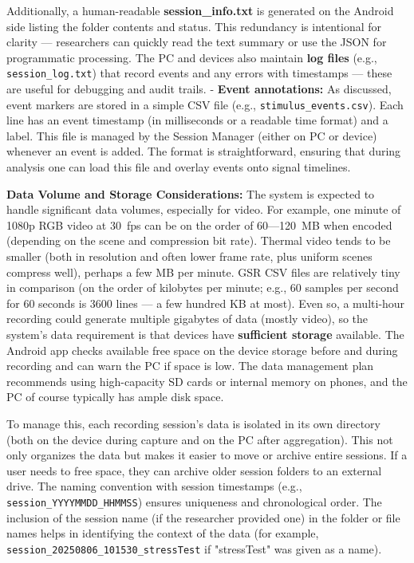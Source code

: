 Additionally, a human-readable \textbf{session_info.txt} is generated on the
Android side listing the folder contents and
status\cite{SessionManagerKt}\cite{Fowles1981}.
This redundancy is intentional for clarity --- researchers can quickly
read the text summary or use the JSON for programmatic processing. The
PC and devices also maintain \textbf{log files} (e.g., \texttt{session_log.txt})
that record events and any errors with timestamps --- these are useful
for debugging and audit trails. - \textbf{Event annotations:} As discussed,
event markers are stored in a simple CSV file (e.g.,
\texttt{stimulus_events.csv}). Each line has an event timestamp (in
milliseconds or a readable time format) and a label. This file is
managed by the Session Manager (either on PC or device) whenever an
event is
added\cite{ContactlessStressThermal2022}.
The format is straightforward, ensuring that during analysis one can
load this file and overlay events onto signal timelines.

\textbf{Data Volume and Storage Considerations:} The system is expected to
handle significant data volumes, especially for video. For example, one
minute of 1080p RGB video at 30 fps can be on the order of 60---120 MB
when encoded (depending on the scene and compression bit rate). Thermal
video tends to be smaller (both in resolution and often lower frame
rate, plus uniform scenes compress well), perhaps a few MB per minute.
GSR CSV files are relatively tiny in comparison (on the order of
kilobytes per minute; e.g., 60 samples per second for 60 seconds is 3600
lines --- a few hundred KB at most). Even so, a multi-hour recording
could generate multiple gigabytes of data (mostly video), so the
system's data requirement is that devices have \textbf{sufficient storage}
available. The Android app checks available free space on the device
storage before and during
recording\cite{SessionManagerKt}
and can warn the PC if space is low. The data management plan recommends
using high-capacity SD cards or internal memory on phones, and the PC of
course typically has ample disk space.

To manage this, each recording session's data is isolated in its own
directory (both on the device during capture and on the PC after
aggregation). This not only organizes the data but makes it easier to
move or archive entire sessions. If a user needs to free space, they can
archive older session folders to an external drive. The naming
convention with session timestamps (e.g., \texttt{session_YYYYMMDD_HHMMSS})
ensures uniqueness and chronological order. The inclusion of the session
name (if the researcher provided one) in the folder or file names helps
in identifying the context of the data (for example,
\texttt{session_20250806_101530_stressTest} if "stressTest" was given as a
name).

